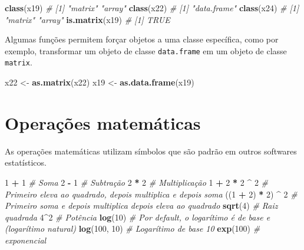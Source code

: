 \documentclass[
]{book}
\newenvironment{Shaded}{\begin{snugshade}}{\end{snugshade}}
\newcommand{\CommentTok}[1]{\textcolor[rgb]{0.56,0.35,0.01}{\textit{#1}}}
\newcommand{\DecValTok}[1]{\textcolor[rgb]{0.00,0.00,0.81}{#1}}
\newcommand{\KeywordTok}[1]{\textcolor[rgb]{0.13,0.29,0.53}{\textbf{#1}}}
\newcommand{\NormalTok}[1]{#1}
\newcommand{\OperatorTok}[1]{\textcolor[rgb]{0.81,0.36,0.00}{\textbf{#1}}}
\newcommand{\StringTok}[1]{\textcolor[rgb]{0.31,0.60,0.02}{#1}}
\begin{document}
\begin{Shaded}
\begin{Highlighting}[]
\KeywordTok{class}\NormalTok{(x19)}
\CommentTok{# [1] "matrix" "array"}
\KeywordTok{class}\NormalTok{(x22)}
\CommentTok{# [1] "data.frame"}
\KeywordTok{class}\NormalTok{(x24)}
\CommentTok{# [1] "matrix" "array"}
\KeywordTok{is.matrix}\NormalTok{(x19)}
\CommentTok{# [1] TRUE}
\end{Highlighting}
\end{Shaded}

Algumas funções permitem forçar objetos a uma classe específica, como por exemplo, transformar um objeto de classe \texttt{data.frame} em um objeto de classe \texttt{matrix}.

\begin{Shaded}
\begin{Highlighting}[]
\NormalTok{x22 <-}\StringTok{ }\KeywordTok{as.matrix}\NormalTok{(x22)}
\NormalTok{x19 <-}\StringTok{ }\KeywordTok{as.data.frame}\NormalTok{(x19)}
\end{Highlighting}
\end{Shaded}

 

\hypertarget{math}{%
\chapter{Operações matemáticas}\label{math}}

As operações matemáticas utilizam símbolos que são padrão em outros softwares estatísticos.

\begin{Shaded}
\begin{Highlighting}[]
\DecValTok{1} \OperatorTok{+}\StringTok{ }\DecValTok{1} \CommentTok{# Soma}
\DecValTok{2} \OperatorTok{-}\StringTok{ }\DecValTok{1} \CommentTok{# Subtração}
\DecValTok{2} \OperatorTok{*}\StringTok{ }\DecValTok{2} \CommentTok{# Multiplicação}
\DecValTok{1} \OperatorTok{+}\StringTok{ }\DecValTok{2} \OperatorTok{*}\StringTok{ }\DecValTok{2} \OperatorTok{^}\StringTok{ }\DecValTok{2} \CommentTok{# Primeiro eleva ao quadrado, depois multiplica e depois soma}
\NormalTok{((}\DecValTok{1} \OperatorTok{+}\StringTok{ }\DecValTok{2}\NormalTok{) }\OperatorTok{*}\StringTok{ }\DecValTok{2}\NormalTok{) }\OperatorTok{^}\StringTok{ }\DecValTok{2} \CommentTok{# Primeiro soma e depois multiplica depois eleva ao quadrado}
\KeywordTok{sqrt}\NormalTok{(}\DecValTok{4}\NormalTok{) }\CommentTok{# Raiz quadrada}
\DecValTok{4}\OperatorTok{^}\DecValTok{2} \CommentTok{# Potência}
\KeywordTok{log}\NormalTok{(}\DecValTok{10}\NormalTok{) }\CommentTok{# Por default, o logarítimo é de base e (logarítimo natural)}
\KeywordTok{log}\NormalTok{(}\DecValTok{100}\NormalTok{, }\DecValTok{10}\NormalTok{) }\CommentTok{# Logarítimo de base 10}
\KeywordTok{exp}\NormalTok{(}\DecValTok{100}\NormalTok{) }\CommentTok{# exponencial}
\end{Highlighting}
\end{Shaded}
\end{document}
